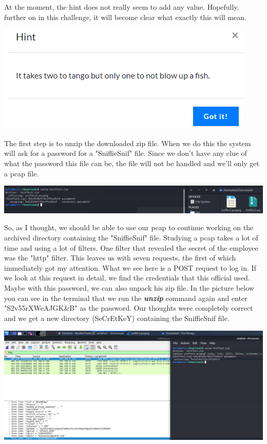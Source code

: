 \documentclass[../main.tex]{subfiles}
\begin{document}
\pagebreak
At the moment, the hint does not really seem to add any value. Hopefully, further on in this challenge, it will become clear what exactly this will mean.
 \begin{center}
    \includegraphics[width=0.5\linewidth]{images/Robbe/sniffer2_writeup2.png}
\end{center}

The first step is to unzip the downloaded zip file. When we do this the system will ask for a password for a "SniffieSnif" file. Since we don't have any clue of what the password this file can be, the file will not be handled and we'll only get a pcap file.
 \begin{center}
    \includegraphics[width=1\linewidth]{images/Robbe/sniffer2_writeup3.png}
\end{center}

So, as I thought, we should be able to use our pcap to continue working on the archived directory containing the "SniffieSnif" file.
Studying a pcap takes a lot of time and using a lot of filters. One filter that revealed the secret of the employee was the "http" filter. This leaves us with seven requests, the first of which immediately got my attention. What we see here is a POST request to log in. If we look at this request in detail, we find the credentials that this official used.
Maybe with this password, we can also unpack his zip file. In the picture below you can see in the terminal that we run the \textbf{\textit{unzip}} command again and enter "S2v55rXWeAJGK&B" as the password. Our thoughts were completely correct and we get a new directory (SeCrEtKeY) containing the SniffieSnif file.

 \begin{center}
    \includegraphics[width=1\linewidth]{images/Robbe/sniffer2_writeup4.png}
\end{center}
\end{document}
